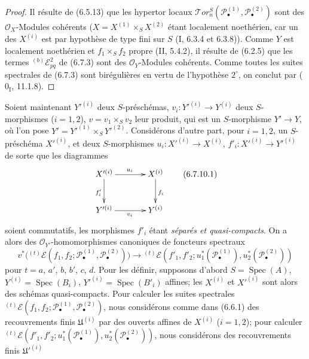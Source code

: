 \begin{proof}
Il résulte de (6.5.13) que les hypertor locaux
$\mathscr{T}\!or_n^S(\mathscr P_\bullet^{(1)},\mathscr P_\bullet^{(2)})$ sont
des $\mathscr O_X$-Modules cohérents
($X=X^{(1)}\times_S X^{(2)}$ étant localement noethérien, car un des
$X^{(i)}$ est par hypothèse de type fini sur $S$ (I, 6.3.4 et 6.3.8)). Comme
$Y$ est localement noethérien et $f_1\times_S f_2$ propre (II, 5.4.2), il
résulte de (6.2.5) que les termes ${}^{(b)}\mathscr E_{pq}^2$ de (6.7.3) sont
des $\mathscr O_Y$-Modules cohérents. Comme toutes les suites spectrales de
(6.7.3) sont birégulières en vertu de l'hypothèse $2^\circ$, on conclut par
($0_{\mathrm I}$, 11.1.8).
\end{proof}

\begin{env}[6.7.10]
Soient maintenant $Y'^{(i)}$ deux $S$-préschémas,
$v_i:Y'^{(i)}\to Y^{(i)}$ deux $S$-morphismes ($i=1,2$),
$v=v_1\times_S v_2$ leur produit, qui est un $S$-morphisme $Y'\to Y$, où
l'on pose $Y'=Y'^{(1)}\times_S Y'^{(2)}$. Considérons d'autre part, pour
$i=1,2$, un $S$-préschéma $X'^{(i)}$, et deux $S$-morphismes
$u_i:X'^{(i)}\to X^{(i)}$, $f'_i:X'^{(i)}\to Y'^{(i)}$ de sorte que les
diagrammes
\[
\xymatrix@C=36pt@R=28pt{
  X'^{(i)}\ar[r]^{u_i}\ar[d]_{f'_i}
  & X^{(i)}\ar[d]^{f_i}
  \\
  Y'^{(i)}\ar[r]_{v_i}
  & Y^{(i)}
}
\tag{6.7.10.1}\label{III.6.7.10.1.fr}
\]
soient commutatifs, les morphismes $f'_i$ étant \emph{séparés et
quasi-compacts}. On a alors des $\mathscr O_{Y'}$-homomorphismes canoniques de
foncteurs spectraux
\[
  v^*\bigl({}^{(t)}\mathscr E
  (f_1,f_2;\mathscr P_\bullet^{(1)},\mathscr P_\bullet^{(2)})\bigr)
  \longrightarrow
  {}^{(t)}\mathscr E
  (f'_1,f'_2;u_1^*(\mathscr P_\bullet^{(1)}),
                 u_2^*(\mathscr P_\bullet^{(2)}))
  \tag{6.7.10.2}\label{III.6.7.10.2.fr}
\]
pour $t=a$, $a'$, $b$, $b'$, $c$, $d$. Pour les définir, supposons d'abord
$S=\operatorname{Spec}(A)$,
$Y^{(i)}=\operatorname{Spec}(B_i)$,
$Y'^{(i)}=\operatorname{Spec}(B'_i)$ affines; les $X^{(i)}$ et $X'^{(i)}$
sont alors des schémas quasi-compacts. Pour calculer les suites spectrales
${}^{(t)}\mathscr E
(f_1,f_2;\mathscr P_\bullet^{(1)},\mathscr P_\bullet^{(2)})$, nous
considérons comme dans (6.6.1) des recouvrements finis
$\mathfrak U^{(i)}$ par des ouverts affines de $X^{(i)}$ ($i=1,2$); pour
calculer
${}^{(t)}\mathscr E
(f'_1,f'_2;u_1^*(\mathscr P_\bullet^{(1)}),
u_2^*(\mathscr P_\bullet^{(2)}))$, nous considérons des recouvrements finis
$\mathfrak U'^{(i)}$


\end{env}
